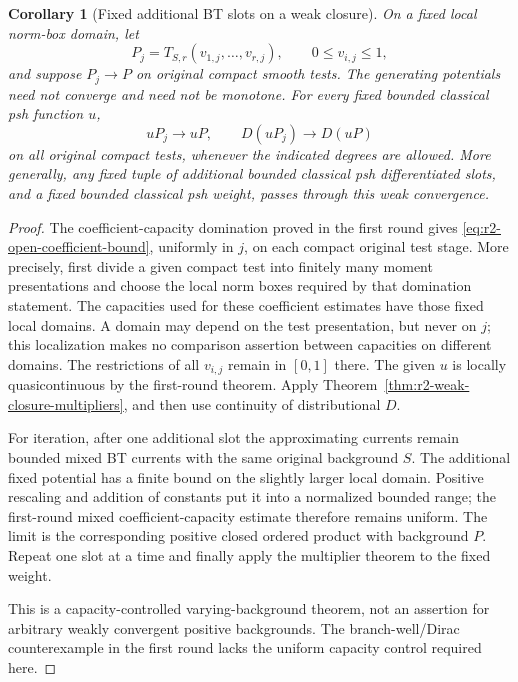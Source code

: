 \documentclass[11pt,a4paper]{article}
\numberwithin{equation}{section}
\newtheorem{corollary}[theorem]{Corollary}
\theoremstyle{definition}
\theoremstyle{remark}
\begin{document}
\begin{corollary}[Fixed additional BT slots on a weak closure]
\label{cor:r2-fixed-slots-closure}
On a fixed local norm-box domain, let
\[
 P_j=T_{S,r}(v_{1,j},\ldots,v_{r,j}),\qquad0\leq v_{i,j}\leq1,
\]
and suppose $P_j\to P$ on original compact smooth tests. The
generating potentials need not converge and need not be monotone.
For every fixed bounded classical psh function $u$,
\[
 uP_j\longrightarrow uP,
 \qquad D(uP_j)\longrightarrow D(uP)
\]
on all original compact tests, whenever the indicated degrees
are allowed. More generally, any fixed tuple of additional bounded
classical psh differentiated slots, and a fixed bounded classical
psh weight, passes through this weak convergence.
\end{corollary}

\begin{proof}
The coefficient-capacity domination proved in the first round
gives \eqref{eq:r2-open-coefficient-bound}, uniformly in $j$, on
each compact original test stage. More precisely, first divide a
given compact test into finitely many moment presentations and
choose the local norm boxes required by that domination statement.
The capacities used for these coefficient estimates have those
fixed local domains. A domain may depend on the test presentation,
but never on $j$; this localization makes no comparison assertion
between capacities on different domains. The restrictions of all
$v_{i,j}$ remain in $[0,1]$ there. The given $u$ is locally
quasicontinuous by the first-round theorem. Apply
Theorem~\ref{thm:r2-weak-closure-multipliers}, and then use
continuity of distributional $D$.

For iteration, after one additional slot the approximating currents
remain bounded mixed BT currents with the same original background
$S$. The additional fixed potential has a finite bound on the
slightly larger local domain. Positive rescaling and addition of
constants put it into a normalized bounded range; the first-round
mixed coefficient-capacity estimate therefore remains uniform.
The limit is the corresponding positive closed ordered product
with background $P$. Repeat one slot at a time and finally apply
the multiplier theorem to the fixed weight.

This is a capacity-controlled varying-background theorem, not an
assertion for arbitrary weakly convergent positive backgrounds.
The branch-well/Dirac counterexample in the first round lacks the
uniform capacity control required here.
\end{proof}
\end{document}
